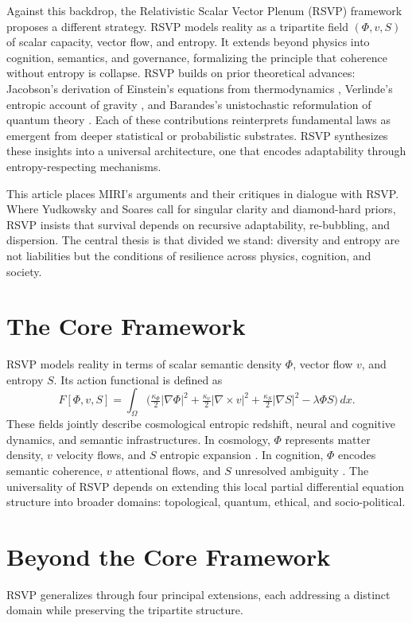 \documentclass[12pt]{article}
\begin{document}
Against this backdrop, the Relativistic Scalar Vector Plenum (RSVP) framework proposes a different strategy. RSVP models reality as a tripartite field $(\Phi, v, S)$ of scalar capacity, vector flow, and entropy. It extends beyond physics into cognition, semantics, and governance, formalizing the principle that coherence without entropy is collapse. RSVP builds on prior theoretical advances: Jacobson’s derivation of Einstein’s equations from thermodynamics \citep{jacobson1995thermodynamics}, Verlinde’s entropic account of gravity \citep{verlinde2011entropic}, and Barandes’s unistochastic reformulation of quantum theory \citep{barandes2022unistochastic}. Each of these contributions reinterprets fundamental laws as emergent from deeper statistical or probabilistic substrates. RSVP synthesizes these insights into a universal architecture, one that encodes adaptability through entropy-respecting mechanisms.

This article places MIRI’s arguments and their critiques in dialogue with RSVP. Where Yudkowsky and Soares call for singular clarity and diamond-hard priors, RSVP insists that survival depends on recursive adaptability, re-bubbling, and dispersion. The central thesis is that divided we stand: diversity and entropy are not liabilities but the conditions of resilience across physics, cognition, and society.

\section{The Core Framework}
RSVP models reality in terms of scalar semantic density $\Phi$, vector flow $v$, and entropy $S$. Its action functional is defined as
\[
F[\Phi,v,S] = \int_\Omega \Big(\tfrac{\kappa_\Phi}{2}|\nabla\Phi|^2 + \tfrac{\kappa_v}{2}|\nabla\times v|^2 + \tfrac{\kappa_S}{2}|\nabla S|^2 - \lambda \Phi S\Big)\,dx.
\]
These fields jointly describe cosmological entropic redshift, neural and cognitive dynamics, and semantic infrastructures. In cosmology, $\Phi$ represents matter density, $v$ velocity flows, and $S$ entropic expansion \citep{jacobson1995thermodynamics}. In cognition, $\Phi$ encodes semantic coherence, $v$ attentional flows, and $S$ unresolved ambiguity \citep{friston2010free}. The universality of RSVP depends on extending this local partial differential equation structure into broader domains: topological, quantum, ethical, and socio-political.

\section{Beyond the Core Framework}
RSVP generalizes through four principal extensions, each addressing a distinct domain while preserving the tripartite structure.
\end{document}

